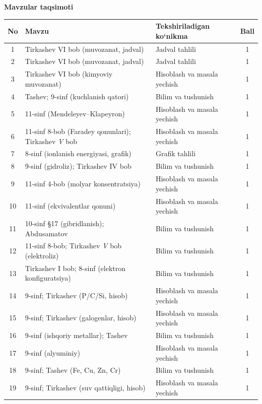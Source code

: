 \documentclass[11pt,a4paper]{article}
\begin{document}
\par\bigskip\noindent\textbf{Mavzular taqsimoti}\par\smallskip
{\small\noindent\begin{longtable}{|c|p{7.2cm}|p{5.4cm}|c|}\hline \textbf{No} & \textbf{Mavzu} & \textbf{Tekshiriladigan ko`nikma} & \textbf{Ball}\\\hline
1 & Tirkashev VI bob (muvozanat, jadval) & Jadval tahlili & 1\\\hline
2 & Tirkashev VI bob (muvozanat, jadval) & Jadval tahlili & 1\\\hline
3 & Tirkashev VI bob (kimyoviy muvozanat) & Hisoblash va masala yechish & 1\\\hline
4 & Tashev; 9-sinf (kuchlanish qatori) & Bilim va tushunish & 1\\\hline
5 & 11-sinf (Mendeleyev--Klapeyron) & Hisoblash va masala yechish & 1\\\hline
6 & 11-sinf 8-bob (Faradey qonunlari); Tirkashev \textit{V} bob & Hisoblash va masala yechish & 1\\\hline
7 & 8-sinf (ionlanish energiyasi, grafik) & Grafik tahlili & 1\\\hline
8 & 9-sinf (gidroliz); Tirkashev IV bob & Bilim va tushunish & 1\\\hline
9 & 11-sinf 4-bob (molyar konsentratsiya) & Hisoblash va masala yechish & 1\\\hline
10 & 11-sinf (ekvivalentlar qonuni) & Hisoblash va masala yechish & 1\\\hline
11 & 10-sinf \S{}17 (gibridlanish); Abdusamatov & Bilim va tushunish & 1\\\hline
12 & 11-sinf 8-bob; Tirkashev \textit{V} bob (elektroliz) & Bilim va tushunish & 1\\\hline
13 & Tirkashev I bob; 8-sinf (elektron konfiguratsiya) & Bilim va tushunish & 1\\\hline
14 & 9-sinf; Tirkashev (P/C/Si, hisob) & Hisoblash va masala yechish & 1\\\hline
15 & 9-sinf; Tirkashev (galogenlar, hisob) & Hisoblash va masala yechish & 1\\\hline
16 & 9-sinf (ishqoriy metallar); Tashev & Bilim va tushunish & 1\\\hline
17 & 9-sinf (alyuminiy) & Hisoblash va masala yechish & 1\\\hline
18 & 9-sinf; Tashev (Fe, Cu, Zn, Cr) & Bilim va tushunish & 1\\\hline
19 & 9-sinf; Tirkashev (suv qattiqligi, hisob) & Hisoblash va masala yechish & 1\\\hline

\end{longtable}}
\end{document}
